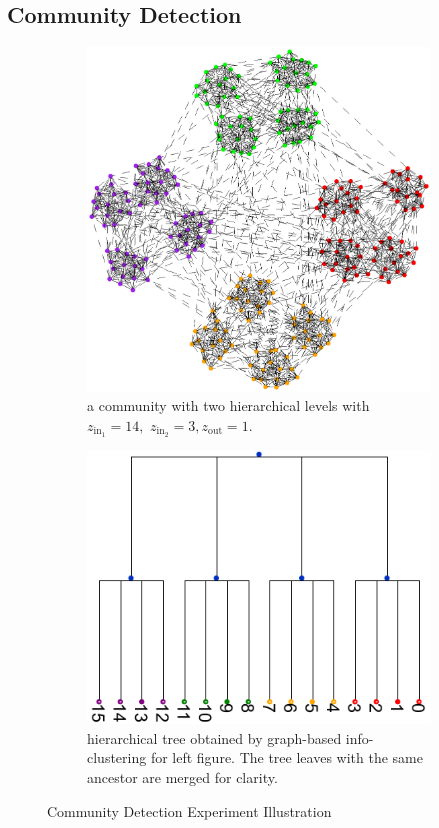 \documentclass{article}
\begin{document}
\subsection{Community Detection}
\begin{figure}
	\centering
	\begin{subfigure}{0.45\textwidth}
		\includegraphics[width=\textwidth]{pic/two_level.eps}
		\caption{a community with two hierarchical levels with $z_{\mathrm{in}_1} = 14,$ $z_{\mathrm{in}_2} = 3, z_{\mathrm{out}}=1$.}\label{fig:c1}
	\end{subfigure}
	\begin{subfigure}{0.45\textwidth}
		\includegraphics[width=\textwidth]{pic/tree_info-clustering.pdf}
		\caption{hierarchical tree obtained by graph-based info-clustering for left figure. The tree leaves with the same ancestor are merged for clarity.}\label{fig:c2}
	\end{subfigure}
	\caption{Community Detection Experiment Illustration}
\end{figure}
\end{document}
